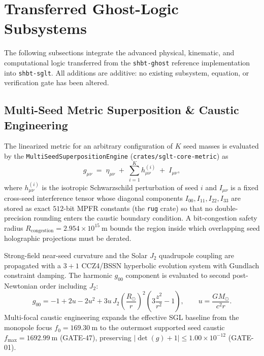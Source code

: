 \documentclass[10pt,twocolumn]{IEEEtran}
\begin{document}
\section{Transferred Ghost-Logic Subsystems}
\label{sec:ghost_transfer}

The following subsections integrate the advanced physical, kinematic, and
computational logic transferred from the \texttt{shbt-ghost} reference
implementation into \texttt{shbt-sglt}.  All additions are additive: no
existing subsystem, equation, or verification gate has been altered.

\subsection{Multi-Seed Metric Superposition \& Caustic Engineering}
\label{sec:multiseed_superposition}

The linearized metric for an arbitrary configuration of $K$ seed masses is
evaluated by the \texttt{MultiSeedSuperpositionEngine}
(\texttt{crates/sglt-core-metric}) as
\begin{equation}
g_{\mu\nu} \;=\; \eta_{\mu\nu} \;+\; \sum_{i=1}^{K} h_{\mu\nu}^{(i)} \;+\; I_{\mu\nu},
\end{equation}
where $h_{\mu\nu}^{(i)}$ is the isotropic Schwarzschild perturbation of seed
$i$ and $I_{\mu\nu}$ is a fixed cross-seed interference tensor whose diagonal
components $I_{00}, I_{11}, I_{22}, I_{33}$ are stored as exact $512$-bit
MPFR constants (the \texttt{rug} crate) so that no double-precision rounding
enters the caustic boundary condition.  A bit-congestion safety radius
$R_{\text{congestion}} = 2.954\times10^{15}\ \mathrm{m}$ bounds the region
inside which overlapping seed holographic projections must be derated.

Strong-field near-seed curvature and the Solar $J_2$ quadrupole coupling are
propagated with a $3{+}1$ CCZ4/BSSN hyperbolic evolution system with
Gundlach constraint damping.  The harmonic $g_{00}$ component is evaluated
to second post-Newtonian order including $J_2$:
\begin{equation}
g_{00} = -1 + 2u - 2u^{2} + 3u\,J_{2}\!\left(\frac{R_{\odot}}{r}\right)^{2}
\left(3\frac{z^{2}}{r^{2}}-1\right),
\qquad u=\frac{GM_{\odot}}{c^{2}r}.
\end{equation}
Multi-focal caustic engineering expands the effective SGL baseline from the
monopole focus $f_{0}=169.30\ \mathrm{m}$ to the outermost supported seed
caustic $f_{\max}=1692.99\ \mathrm{m}$ (GATE-47), preserving
$\vert{}\det(g)+1\vert{} \le 1.00\times10^{-12}$ (GATE-01).
\end{document}
